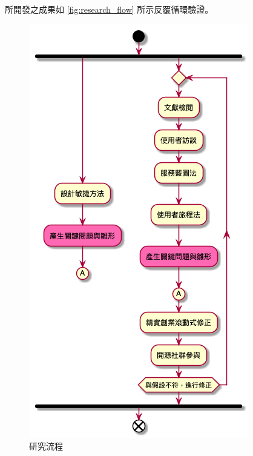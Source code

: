 \documentclass[12pt,a4paper]{article}
\begin{document}
所開發之成果如 \ref{fig:research_flow} 所示反覆循環驗證。
\begin{figure}[htbp]
\centering
\includegraphics[width=.9\linewidth]{./images/research_flow.png}
\caption{\label{fig:org7e1c5fc}
研究流程}
\end{figure}
\end{document}

